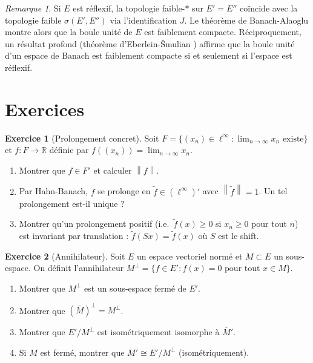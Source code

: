 \documentclass[a4paper,12pt]{book}
\newcommand{\R}{\mathbb{R}}
\newcommand{\norm}[1]{\left\| #1 \right\|}
\theoremstyle{definition}
\newtheorem{exercice}{Exercice}[chapter]
\theoremstyle{plain}
\theoremstyle{remark}
\newtheorem{remarque}[definition]{Remarque}
\begin{document}
\begin{remarque}\label{rem:alaoglu-reflexif}
Si $E$ est réflexif, la topologie faible-$*$ sur $E' = E''$ coïncide avec la topologie
faible $\sigma(E', E'')$ via l'identification $J$. Le théorème de Banach-Alaoglu montre
alors que la boule unité de $E$ est faiblement compacte.
Réciproquement, un résultat profond (théorème d'Eberlein-\v{S}mulian%
) affirme que
la boule unité d'un espace de Banach est faiblement compacte si et seulement si l'espace
est réflexif.
\end{remarque}


\section{Exercices}
\label{sec:exos-chap4}

\begin{exercice}[Prolongement concret]\label{exo:prolongement-concret}
Soit $F = \{(x_n) \in \ell^\infty : \lim_{n\to\infty} x_n \text{ existe}\}$ et
$f : F \to \R$ définie par $f((x_n)) = \lim_{n\to\infty} x_n$.
\begin{enumerate}[label=(\alph*)]
    \item Montrer que $f \in F'$ et calculer $\norm{f}$.
    \item Par Hahn-Banach, $f$ se prolonge en $\tilde{f} \in (\ell^\infty)'$ avec
          $\norm{\tilde{f}} = 1$. Un tel prolongement est-il unique ?
    \item Montrer qu'un prolongement positif (i.e.\ $\tilde{f}(x) \geq 0$ si $x_n \geq 0$
          pour tout $n$) est invariant par translation
          : $\tilde{f}(Sx) = \tilde{f}(x)$ où $S$ est le shift.
\end{enumerate}
\end{exercice}

\begin{exercice}[Annihilateur]\label{exo:annihilateur}
Soit $E$ un espace vectoriel normé et $M \subset E$ un sous-espace. On définit
l'annihilateur $M^\perp = \{f \in E' : f(x) = 0 \text{ pour tout } x \in M\}$.
\begin{enumerate}[label=(\alph*)]
    \item Montrer que $M^\perp$ est un sous-espace fermé de $E'$.
    \item Montrer que $(\overline{M})^\perp = M^\perp$.
    \item Montrer que $E'/M^\perp$ est isométriquement isomorphe à $\overline{M}'$.
    \item Si $M$ est fermé, montrer que $M' \cong E'/M^\perp$ (isométriquement).
\end{enumerate}
\end{exercice}
\end{document}
